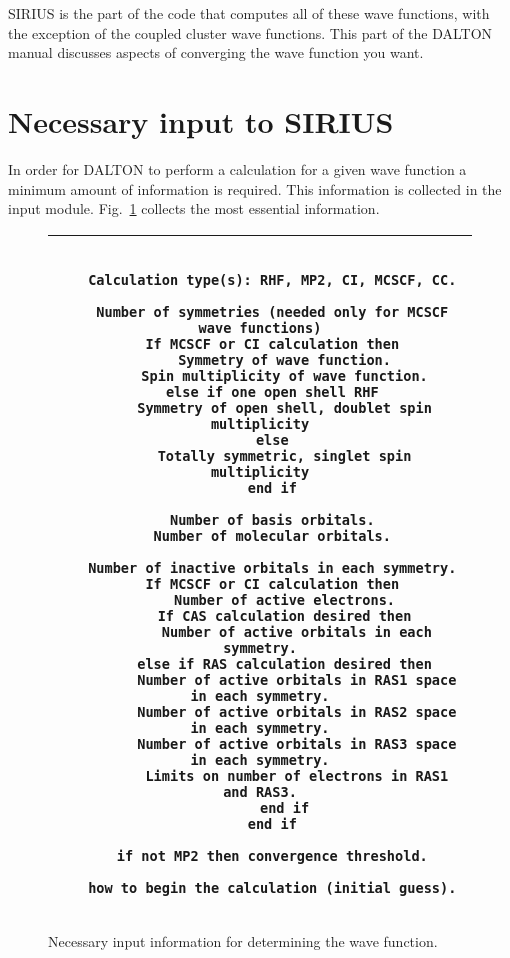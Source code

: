 SIRIUS is the part of the code that computes all of these
wave functions, with the exception of the coupled cluster wave functions.
This part of the DALTON manual discusses aspects of converging the
wave function you want.

\section{\label{sec:ig_necinp} Necessary input to SIRIUS}

In order for DALTON to perform a calculation for a given wave function a
minimum amount of
information is required. This information is collected in the
 input module. Fig.~\ref{fig-nec.inp.} collects the most
essential information.

\begin{figure}
    \newlength{\mpwidth}
    \settowidth{\mpwidth}{\tt M}
    \addtolength{\mpwidth}{65\mpwidth}
\begin{tabular}{|c|}
\hline
\begin{minipage}{\mpwidth}
\begin{verbatim}

   Calculation type(s): RHF, MP2, CI, MCSCF, CC.

   Number of symmetries (needed only for MCSCF wave functions)
   If MCSCF or CI calculation then
      Symmetry of wave function.
      Spin multiplicity of wave function.
   else if one open shell RHF
      Symmetry of open shell, doublet spin multiplicity
   else
      Totally symmetric, singlet spin multiplicity
   end if

   Number of basis orbitals.
   Number of molecular orbitals.

   Number of inactive orbitals in each symmetry.
   If MCSCF or CI calculation then
      Number of active electrons.
      If CAS calculation desired then
         Number of active orbitals in each symmetry.
      else if RAS calculation desired then
         Number of active orbitals in RAS1 space in each symmetry.
         Number of active orbitals in RAS2 space in each symmetry.
         Number of active orbitals in RAS3 space in each symmetry.
         Limits on number of electrons in RAS1 and RAS3.
      end if
   end if

   if not MP2 then convergence threshold.

   how to begin the calculation (initial guess).

\end{verbatim}
\end{minipage} \\ \hline
\end{tabular}
\vspace{0.5cm}
\caption{Necessary input information for determining the wave
function.}\label{fig-nec.inp.}
\end{figure}



